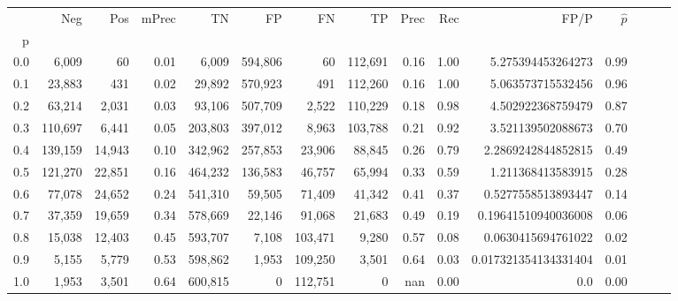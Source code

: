 \begin{tabular}{rrrrrrrrrrrrrrr}
\toprule
{} &      Neg &     Pos & mPrec &       TN &       FP &       FN &       TP &  Prec &   Rec &                  FP/P & $\hat{p}$ \\
p   &          &         &       &          &          &          &          &       &       &                       &           \\
\midrule
0.0 &    6,009 &      60 &  0.01 &    6,009 &  594,806 &       60 &  112,691 &  0.16 &  1.00 &     5.275394453264273 &      0.99 \\
0.1 &   23,883 &     431 &  0.02 &   29,892 &  570,923 &      491 &  112,260 &  0.16 &  1.00 &     5.063573715532456 &      0.96 \\
0.2 &   63,214 &   2,031 &  0.03 &   93,106 &  507,709 &    2,522 &  110,229 &  0.18 &  0.98 &     4.502922368759479 &      0.87 \\
0.3 &  110,697 &   6,441 &  0.05 &  203,803 &  397,012 &    8,963 &  103,788 &  0.21 &  0.92 &     3.521139502088673 &      0.70 \\
0.4 &  139,159 &  14,943 &  0.10 &  342,962 &  257,853 &   23,906 &   88,845 &  0.26 &  0.79 &    2.2869242844852815 &      0.49 \\
0.5 &  121,270 &  22,851 &  0.16 &  464,232 &  136,583 &   46,757 &   65,994 &  0.33 &  0.59 &     1.211368413583915 &      0.28 \\
0.6 &   77,078 &  24,652 &  0.24 &  541,310 &   59,505 &   71,409 &   41,342 &  0.41 &  0.37 &    0.5277558513893447 &      0.14 \\
0.7 &   37,359 &  19,659 &  0.34 &  578,669 &   22,146 &   91,068 &   21,683 &  0.49 &  0.19 &   0.19641510940036008 &      0.06 \\
0.8 &   15,038 &  12,403 &  0.45 &  593,707 &    7,108 &  103,471 &    9,280 &  0.57 &  0.08 &    0.0630415694761022 &      0.02 \\
0.9 &    5,155 &   5,779 &  0.53 &  598,862 &    1,953 &  109,250 &    3,501 &  0.64 &  0.03 &  0.017321354134331404 &      0.01 \\
1.0 &    1,953 &   3,501 &  0.64 &  600,815 &        0 &  112,751 &        0 &   nan &  0.00 &                   0.0 &      0.00 \\
\bottomrule
\end{tabular}
